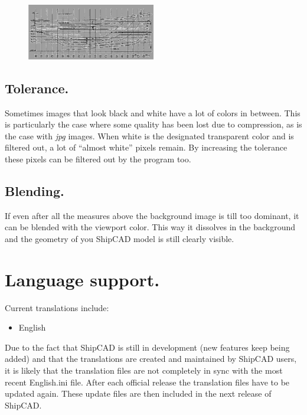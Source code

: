 \documentclass[12pt]{article}
\begin{document}
\begin{figure}
        \centering
        \includegraphics[width=0.5\textwidth,natwidth=578,natheight=253]{backgroundimage-3.png}
        \caption{}
        \label{fig:backgroundimage3}
\end{figure}

\subsection{Tolerance.}
Sometimes images that look black and white
have a lot of colors in between. This is
particularly the case where some quality has
been lost due to compression, as is the case
with \textit{jpg} images. When white is the designated
transparent color and is filtered out, a lot of
``almost white'' pixels remain. By increasing the
tolerance these pixels can be filtered out by the
program too.

\subsection{Blending.}
If even after all the measures above the background image is till too
dominant, it can be blended with the viewport color. This way it
dissolves in the background and the geometry of you ShipCAD model is
still clearly visible.

\pagebreak

\section{Language support.} \label{language-support}
Current translations include:

\begin{itemize}

\item English

\end{itemize}

Due to the fact that ShipCAD is still in development (new features
keep being added) and that the translations are created and maintained
by ShipCAD users, it is likely that the translation files are not
completely in sync with the most recent English.ini file. After each
official release the translation files have to be updated again. These
update files are then included in the next release of ShipCAD.
\end{document}
